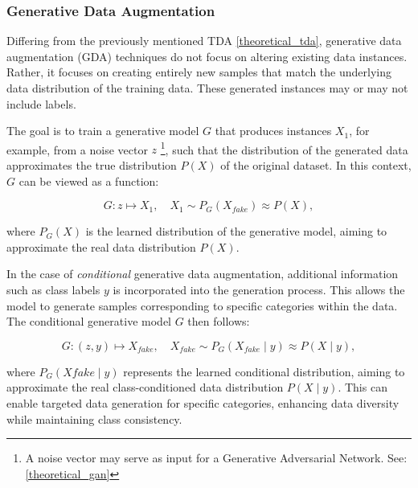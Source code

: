 \subsubsection[Generative Data Augmentation - GDA]{Generative Data Augmentation}\label{theoretical_gda}
Differing from the previously mentioned TDA \ref{theoretical_tda}, generative data augmentation (GDA) techniques do not focus on altering existing data instances. Rather, it focuses on creating entirely new samples that match the underlying data distribution of the training data. These generated instances may or may not include labels.

The goal is to train a generative model \( G \) that produces instances \( X_1 \), for example, from a noise vector \( z \) \footnote{A noise vector may serve as input for a Generative Adversarial Network. See: \ref{theoretical_gan}}, such that the distribution of the generated data approximates the true distribution \( P(X) \) of the original dataset. In this context, \( G \) can be viewed as a function:

\[
G: z \mapsto X_1, \quad X_1 \sim P_G(X_{fake}) \approx P(X),
\]

\noindent
where \( P_G(X) \) is the learned distribution of the generative model, aiming to approximate the real data distribution \( P(X) \).

In the case of \textit{conditional} generative data augmentation, additional information such as class labels \( y \) is incorporated into the generation process. This allows the model to generate samples corresponding to specific categories within the data. The conditional generative model \( G \) then follows:

\[
G: (z, y) \mapsto X_{fake}, \quad X_{fake} \sim P_G(X_{fake} \mid y) \approx P(X \mid y),
\]

\noindent
where \( P_G(X{fake} \mid y) \) represents the learned conditional distribution, aiming to approximate the real class-conditioned data distribution \( P(X \mid y) \). This can enable targeted data generation for specific categories, enhancing data diversity while maintaining class consistency.





